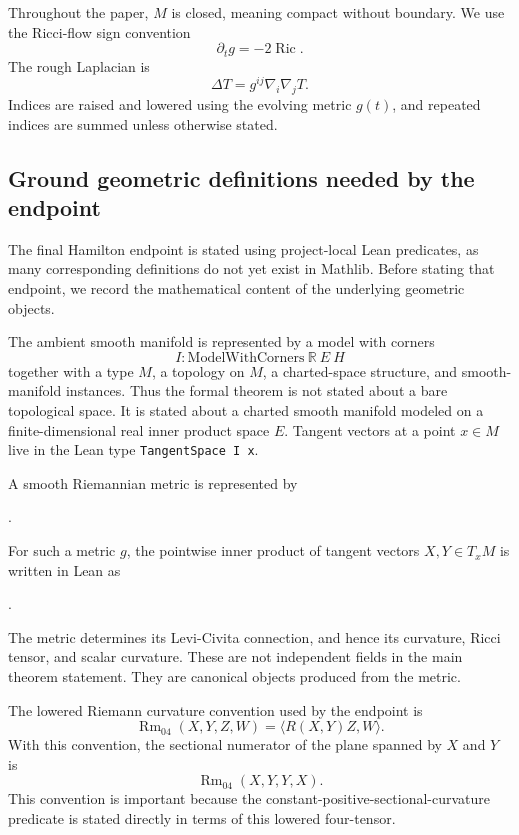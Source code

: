 \documentclass[11pt]{article}
\theoremstyle{plain}
\theoremstyle{definition}
\theoremstyle{remark}
\newcommand{\Ric}{\operatorname{Ric}}
\begin{document}
Throughout the paper, $M$ is closed, meaning compact without boundary.  We use
the Ricci-flow sign convention
\[
  \partial_t g=-2\Ric.
\]
The rough Laplacian is
\[
  \Delta T=g^{ij}\nabla_i\nabla_jT.
\]
Indices are raised and lowered using the evolving metric $g(t)$, and repeated
indices are summed unless otherwise stated.

\subsection{Ground geometric definitions needed by the endpoint}
\label{subsec:ground-definitions-for-endpoint}

The final Hamilton endpoint is stated using project-local Lean predicates, as many corresponding definitions do not yet exist in Mathlib.
Before stating that endpoint, we record the mathematical content of the
underlying geometric objects.

The ambient smooth manifold is represented by a model with corners
\[
  I : \mathrm{ModelWithCorners}\ \mathbb{R}\ E\ H
\]
together with a type \(M\), a topology on \(M\), a charted-space structure, and
smooth-manifold instances.  Thus the formal theorem is not stated about a bare
topological space.  It is stated about a charted smooth manifold modeled on a
finite-dimensional real inner product space \(E\).  Tangent vectors at a point
\(x\in M\) live in the Lean type \texttt{TangentSpace I x}.

A smooth Riemannian metric is represented by
\begin{center}
\texttt{}.
\end{center}
For such a metric \(g\), the pointwise inner product of tangent vectors
\(X,Y\in T_xM\) is written in Lean as
\begin{center}
\texttt{}.
\end{center}
The metric determines its Levi-Civita connection, and hence its curvature,
Ricci tensor, and scalar curvature.  These are not independent fields in the
main theorem statement.  They are canonical objects produced from the metric.

The lowered Riemann curvature convention used by the endpoint is
\[
  \operatorname{Rm}_{04}(X,Y,Z,W)=\langle R(X,Y)Z,W\rangle .
\]
With this convention, the sectional numerator of the plane spanned by \(X\) and
\(Y\) is
\[
  \operatorname{Rm}_{04}(X,Y,Y,X).
\]
This convention is important because the constant-positive-sectional-curvature
predicate is stated directly in terms of this lowered four-tensor.
\end{document}
